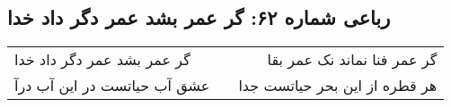 \begin{center}
\section*{رباعی شماره ۶۲: گر عمر بشد عمر دگر داد خدا}
\label{sec:0062}
\begin{longtable}{l p{0.5cm} r}
گر عمر بشد عمر دگر داد خدا
&&
گر عمر فنا نماند نک عمر بقا
\\
عشق آب حیاتست در این آب درآ
&&
هر قطره از این بحر حیاتست جدا
\\
\end{longtable}
\end{center}
